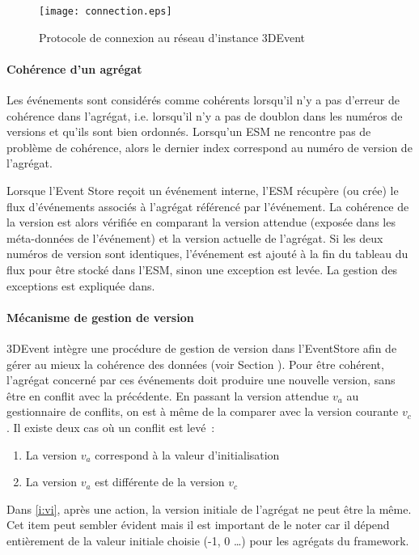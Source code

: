 \begin{figure}[h]
	\noindent
	\centering
	\texttt{[image: connection.eps]}
	\caption{Protocole de connexion au réseau d'instance 3DEvent}
	\label{fig:connexionpairs}
\end{figure}

\paragraph{Cohérence d'un agrégat}
Les événements sont considérés comme \og cohérents\fg{}  lorsqu'il n'y a pas 
d'erreur de cohérence dans l'agrégat, i.e. lorsqu'il n'y a pas de doublon dans les 
numéros de versions et qu'ils sont bien ordonnés. Lorsqu'un \gls{ESM} ne 
rencontre pas de problème de cohérence, alors le 
dernier index correspond au numéro de version de l'agrégat. 

Lorsque l'Event Store reçoit un événement interne, l'\gls{ESM} récupère (ou crée) 
le flux d'événements associés à l'agrégat référencé par l'événement. 
La cohérence de la version est alors vérifiée en comparant la version attendue 
(exposée dans les méta-données de l'événement) et la version actuelle de 
l'agrégat. 
Si les deux numéros de version sont identiques, l'événement est ajouté à la fin du 
tableau du flux pour être stocké dans l'\gls{ESM}, sinon une exception est levée. 
La gestion des exceptions est expliquée dans. 

\paragraph{Mécanisme de gestion de version}
3DEvent intègre une procédure de gestion de version dans l'\gls{EventStore} afin 
de gérer au mieux la cohérence des données (voir Section ). 
Pour être cohérent, l'agrégat concerné par ces 
événements doit produire une nouvelle version, sans être en conflit avec la 
précédente. En passant la version attendue $v_a$ au gestionnaire de conflits, on 
est à même de la comparer avec la version courante $v_c$. Il existe deux cas où 
un conflit est levé~: 
\begin{enumerate}[label=\alph*)]
	\item \label{i:vi} La version $v_a$ correspond à la valeur d'initialisation
	\item \label{i:vdiff} La version $v_a$ est différente de la version $v_c$
\end{enumerate}
Dans \ref{i:vi}, après une action, la version initiale de l'agrégat ne 
peut être la même. Cet item peut sembler évident mais il est important de le noter 
car il dépend entièrement de la valeur initiale choisie (-1, 0 \dots) pour les agrégats 
du \gls{framework}.



